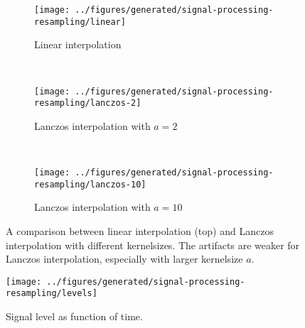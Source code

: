 %
\begin{figure}
    \begin{subfigure}{\textwidth}
        \texttt{[image: ../figures/generated/signal-processing-resampling/linear]}
        \caption{Linear interpolation}
    \end{subfigure}
    ~
    \begin{subfigure}{\textwidth}
        \texttt{[image: ../figures/generated/signal-processing-resampling/lanczos-2]}
        \caption{Lanczos interpolation with $a=2$}
    \end{subfigure}
    ~
    \begin{subfigure}{\textwidth}
        \texttt{[image: ../figures/generated/signal-processing-resampling/lanczos-10]}
        \caption{Lanczos interpolation with $a=10$}
    \end{subfigure}
    \caption{A comparison between linear interpolation (top) and Lanczos interpolation with different kernelsizes. The artifacts are weaker for Lanczos interpolation, especially with larger kernelsize $a$.}
    \label{fig:theory:signal-processing:resampling}
\end{figure}

\begin{figure}
    \texttt{[image: ../figures/generated/signal-processing-resampling/levels]}
    \caption{Signal level as function of time.}
    \label{fig:theory:signal-processing:resampling:levels}
\end{figure}



%
%
%

